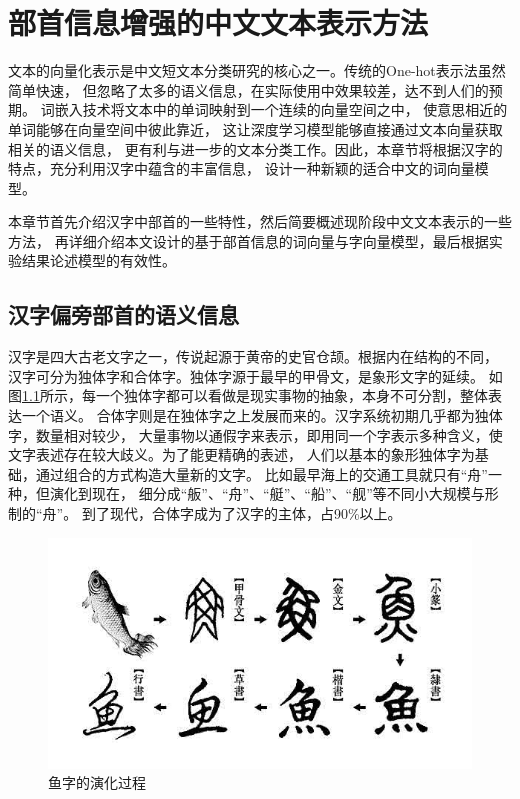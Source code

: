 \chapter{部首信息增强的中文文本表示方法}
\label{3_section}
文本的向量化表示是中文短文本分类研究的核心之一。传统的One-hot表示法虽然简单快速，
但忽略了太多的语义信息，在实际使用中效果较差，达不到人们的预期。
词嵌入技术将文本中的单词映射到一个连续的向量空间之中，
使意思相近的单词能够在向量空间中彼此靠近，
这让深度学习模型能够直接通过文本向量获取相关的语义信息，
更有利与进一步的文本分类工作。因此，本章节将根据汉字的特点，充分利用汉字中蕴含的丰富信息，
设计一种新颖的适合中文的词向量模型。

本章节首先介绍汉字中部首的一些特性，然后简要概述现阶段中文文本表示的一些方法，
再详细介绍本文设计的基于部首信息的词向量与字向量模型，最后根据实验结果论述模型的有效性。
\section{汉字偏旁部首的语义信息}
\label{radical_information}
汉字是四大古老文字之一，传说起源于黄帝的史官仓颉。根据内在结构的不同，
汉字可分为独体字和合体字。独体字源于最早的甲骨文，是象形文字的延续。
如图\ref{char_fish}所示，每一个独体字都可以看做是现实事物的抽象，本身不可分割，整体表达一个语义。
合体字则是在独体字之上发展而来的。汉字系统初期几乎都为独体字，数量相对较少，
大量事物以通假字来表示，即用同一个字表示多种含义，使文字表述存在较大歧义。为了能更精确的表述，
人们以基本的象形独体字为基础，通过组合的方式构造大量新的文字。
比如最早海上的交通工具就只有“舟”一种，但演化到现在，
细分成“舨”、“舟”、“艇”、“船”、“舰”等不同小大规模与形制的“舟”。
到了现代，合体字成为了汉字的主体，占90\%以上。
\begin{figure}[h]
    \includegraphics[scale=0.6]{picture/char.png}
    \caption{鱼字的演化过程}
    \label{char_fish}
\end{figure}

